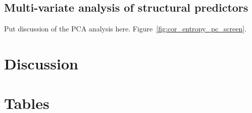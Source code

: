 \documentclass[12pt]{article}
\begin{document}
\subsection*{Multi-variate analysis of structural predictors}

{\color{blue} Put discussion of the PCA analysis here. Figure~\ref{fig:cor_entropy_pc_screen}.}
	
    	
\section*{Discussion}





\newpage

\section*{Tables}
\end{document}
